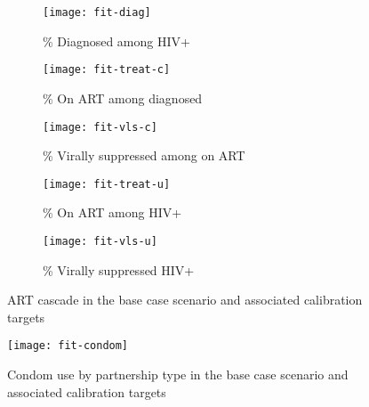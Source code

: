 \begin{figure}[h]
  \begin{subfigure}{\linewidth}
    \texttt{[image: fit-diag]}
    \caption{\% Diagnosed among HIV+}
    \label{fig:fit.cas.dx}
  \end{subfigure}
  \begin{subfigure}{\linewidth}
    \texttt{[image: fit-treat-c]}
    \caption{\% On ART among diagnosed}
    \label{fig:fit.cas.treat-c}
  \end{subfigure}
  \begin{subfigure}{\linewidth}
    \texttt{[image: fit-vls-c]}
    \caption{\% Virally suppressed among on ART}
    \label{fig:fit.cas.vls-c}
  \end{subfigure}
  \begin{subfigure}{\linewidth}
    \texttt{[image: fit-treat-u]}
    \caption{\% On ART among HIV+}
    \label{fig:fit.cas.treat-u}
  \end{subfigure}
  \begin{subfigure}{\linewidth}
    \texttt{[image: fit-vls-u]}
    \caption{\% Virally suppressed HIV+}
    \label{fig:fit.cas.vls-u}
  \end{subfigure}
  \caption{ART cascade in the base case scenario and associated calibration targets}
  \label{fig:fit.cas}
\end{figure}
\clearpage\restoregeometry
\begin{figure}[h]
  \texttt{[image: fit-condom]}
  \caption{Condom use by partnership type in the base case scenario and associated calibration targets}
  \label{fig:fit.condom}
\end{figure}
\clearpage
\printbibliography